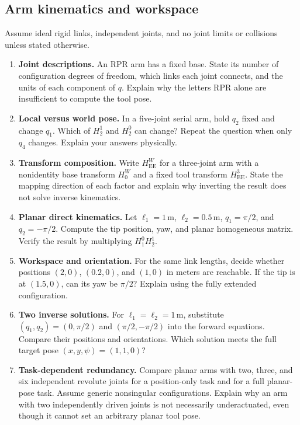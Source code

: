 \subsection{Arm kinematics and workspace}
Assume ideal rigid links, independent joints, and no joint limits or
collisions unless stated otherwise.
\begin{enumerate}
\item \textbf{Joint descriptions.} An RPR arm has a fixed base. State its
number of configuration degrees of freedom, which links each joint connects,
and the units of each component of $q$. Explain why the letters RPR alone
are insufficient to compute the tool pose.

\item \textbf{Local versus world pose.} In a five-joint serial arm, hold
$q_2$ fixed and change $q_1$. Which of $H_2^1$ and $H_2^0$ can change?
Repeat the question when only $q_4$ changes. Explain your answers physically.

\item \textbf{Transform composition.} Write $H_{\mathrm{EE}}^W$ for a
three-joint arm with a nonidentity base transform $H_0^W$ and a fixed tool
transform $H_{\mathrm{EE}}^3$. State the mapping direction of each factor
and explain why inverting the result does not solve inverse kinematics.

\item \textbf{Planar direct kinematics.} Let $\ell_1=1\,\mathrm m$,
$\ell_2=0.5\,\mathrm m$, $q_1=\pi/2$, and $q_2=-\pi/2$. Compute the
tip position, yaw, and planar homogeneous matrix. Verify the result by
multiplying $H_1^0H_2^1$.

\item \textbf{Workspace and orientation.} For the same link lengths,
decide whether positions $(2,0)$, $(0.2,0)$, and $(1,0)$ in meters are
reachable. If the tip is at $(1.5,0)$, can its yaw be $\pi/2$? Explain
using the fully extended configuration.

\item \textbf{Two inverse solutions.} For $\ell_1=\ell_2=1\,\mathrm m$,
substitute $(q_1,q_2)=(0,\pi/2)$ and $(\pi/2,-\pi/2)$ into the forward
equations. Compare their positions and orientations. Which solution meets
the full target pose $(x,y,\psi)=(1,1,0)$?

\item \textbf{Task-dependent redundancy.} Compare planar arms with two,
three, and six independent revolute joints for a position-only task and
for a full planar-pose task. Assume generic nonsingular configurations.
Explain why an arm with two independently driven joints is not necessarily
underactuated, even though it cannot set an arbitrary planar tool pose.
\end{enumerate}

